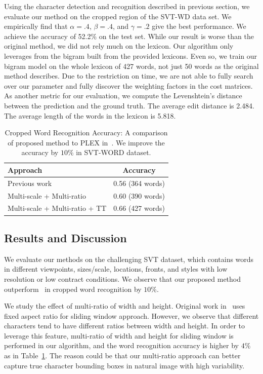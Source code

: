 \documentclass[10pt,twocolumn,letterpaper]{article}
\begin{document}
Using the character detection and recognition described in previous section, we evaluate our method on the cropped region of the SVT-WD data set. We empirically find that $\alpha=.4$, $\beta=.4$, and $\gamma=.2$ give the best performance. We achieve the accuracy of 52.2\% on the test set. While our result is worse than the original method, we did not rely much on the lexicon. Our algorithm only leverages from the bigram built from the provided lexicons. Even so, we train our bigram model on the whole lexicon of 427 words, not just 50 words as the original method describes. Due to the restriction on time, we are not able to fully search over our parameter and fully discover the weighting factors in the cost matrices. As another metric for our evaluation, we compute the Levenshtein's distance between the prediction and the ground truth. The average edit distance is 2.484. The average length of the words in the lexicon is 5.818.

\begin{table}
\begin{center}
\begin{tabular}{|l|c|}
\hline
Approach & Accuracy \\
\hline\hline
Previous work~\cite{417}  & 0.56 (364 words) \\
Multi-scale + Multi-ratio & 0.60 (390 words)\\
Multi-scale + Multi-ratio + TT & 0.66 (427 words)\\
\hline
\end{tabular}
\end{center}
\caption{Cropped Word Recognition Accuracy: A comparison of proposed method to PLEX in~\cite{417}. We improve the accuracy by $10\%$ in SVT-WORD dataset.}
\label{table:compare}
\end{table}

\subsection{Results and Discussion}

We evaluate our methods on the challenging SVT dataset, which contains words in different viewpoints, sizes/scale, locations, fronts, and styles with low resolution or low contract conditions. We observe that our proposed method outperform~\cite{117} in cropped word recognition by $10\%$.

We study the effect of multi-ratio of width and height. Original work in~\cite{417} uses fixed aspect ratio for sliding window approach. However, we observe that different characters tend to have different ratios between width and height. In order to leverage this feature, multi-ratio of width and height for sliding window is performed in our algorithm, and the word recognition accuracy is higher by $4\%$ as in Table~\ref{table:compare}. The reason could be that our multi-ratio approach can better capture true character bounding boxes in natural image with high variability.
\end{document}
